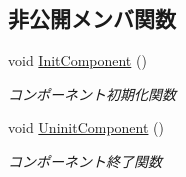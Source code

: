 \subsection*{非公開メンバ関数}
\begin{DoxyCompactItemize}
\item 
void \mbox{\hyperlink{class_game_object_base_a5f4d4e3d23603d8e32ddb220a53039a6}{Init\+Component}} ()
\begin{DoxyCompactList}\small\item\em コンポーネント初期化関数 \end{DoxyCompactList}\item 
void \mbox{\hyperlink{class_game_object_base_aff8e4f486435f5d921c186b0824e8a0e}{Uninit\+Component}} ()
\begin{DoxyCompactList}\small\item\em コンポーネント終了関数 \end{DoxyCompactList}\end{DoxyCompactItemize}

